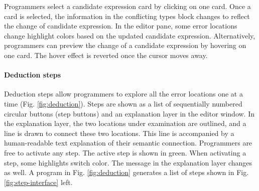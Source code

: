 

Programmers select a candidate expression card by clicking on one card. Once a card is selected, the information in the conflicting types block changes to reflect the change of candidate expression. In the editor pane, some error locations change highlight colors based on the updated candidate expression. Alternatively, programmers can preview the change of a candidate expression by hovering on one card. The hover effect is reverted once the cursor moves away. 


\paragraph{Deduction steps}  \label{sub:deduction-steps}



Deduction steps allow programmers to explore all the error locations one at a time (Fig. \ref{fig:deduction}). Steps are shown as a list of sequentially  numbered circular buttons (step buttons) and an explanation layer in the editor window. In the explanation layer, the two locations under examination are outlined, and a line is drawn to connect these two locations. This line is accompanied by a human-readable text explanation of their semantic connection. Programmers are free to activate any step. The active step is shown in green. When activating a step, some highlights switch color. The message in the explanation layer changes as well. A program in Fig. \ref{fig:deduction} generates a list of steps shown in Fig. \ref{fig:step-interface} left.


